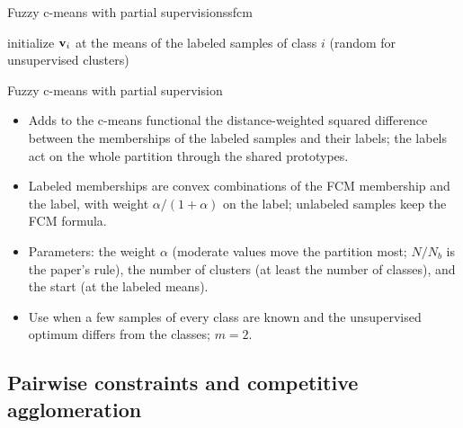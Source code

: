 \begin{algobox}{Fuzzy c-means with partial supervision}{ssfcm}
\begin{algorithm}[H]
initialize $\mathbf{v}_i$ at the means of the labeled samples of class $i$ (random for unsupervised clusters)\;
\end{algorithm}
\end{algobox}
\begin{summarybox}{Fuzzy c-means with partial supervision}
\begin{itemize}
  \item Adds to the c-means functional the distance-weighted squared difference between the memberships of the labeled samples and their labels; the labels act on the whole partition through the shared prototypes.
  \item Labeled memberships are convex combinations of the FCM membership and the label, with weight $\alpha/(1+\alpha)$ on the label; unlabeled samples keep the FCM formula.
  \item Parameters: the weight $\alpha$ (moderate values move the partition most; $N/N_b$ is the paper's rule), the number of clusters (at least the number of classes), and the start (at the labeled means).
  \item Use when a few samples of every class are known and the unsupervised optimum differs from the classes; $m=2$.
\end{itemize}
\end{summarybox}

\subsection{Pairwise constraints and competitive agglomeration}\label{sec:beyond:pcca}

